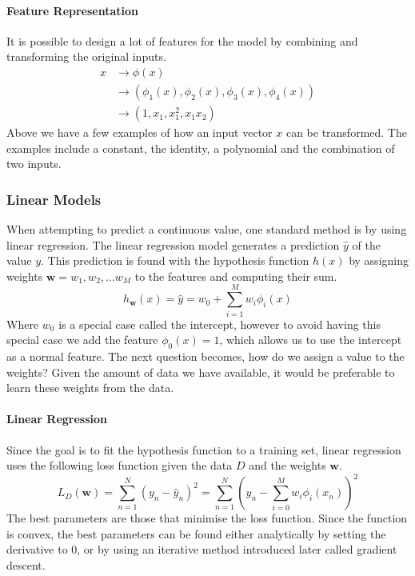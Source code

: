 \paragraph{Feature Representation}\label{sec:phi}
It is possible to design a lot of features for the model by combining and transforming the original inputs.
\begin{align*}
x & \rightarrow \phi(x) \\
  & \rightarrow (\phi_1(x), \phi_2(x), \phi_3(x), \phi_4(x)) \\
  & \rightarrow (1, x_1, x_1^2, x_1x_2)
\end{align*} 
Above we have a few examples of how an input vector $x$ can be transformed.
The examples include a constant, the identity, a polynomial and the combination of two inputs.

\subsubsection{Linear Models}

When attempting to predict a continuous value, one standard method is by using linear regression.
The linear regression model generates a prediction $\hat{y}$ of the value $y$. This prediction is found with the hypothesis function $h(x)$ by assigning weights $\textbf{w} = w_1, w_2, \dots w_M$ to the features and computing their sum.
\[h_{\textbf{w}}(x) = \hat{y} = w_0 + \sum_{i=1}^M w_i \phi_i(x) \]
Where $w_0$ is a special case called the intercept, however to avoid having this special case we add the feature $\phi_0(x)=1$, which allows us to use the intercept as a normal feature. 
The next question becomes, how do we assign a value to the weights?
Given the amount of data we have available, it would be preferable to learn these weights from the data. 

\paragraph{Linear Regression}
Since the goal is to fit the hypothesis function to a training set, linear regression uses the following loss function given the data $D$ and the weights $\textbf{w}$.
\[ L_D(\textbf{w}) = \sum_{n=1}^N (y_n-\hat{y}_n)^2 = \sum_{n=1}^N \left(y_n - \sum_{i=0}^M w_i \phi_i(x_n)\right)^{2} \] 
The best parameters are those that minimise the loss function. Since the function is convex, the best parameters can be found either analytically by setting the derivative to 0, or by using an iterative method introduced later called gradient descent.

